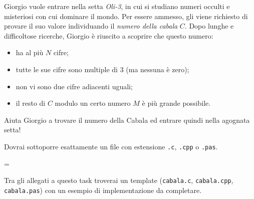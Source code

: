 \usepackage{xcolor}
\usepackage{afterpage}
\usepackage{pifont,mdframed}
\usepackage[bottom]{footmisc}

\makeatletter
\gdef\this@inputfilename{input.txt}
\gdef\this@outputfilename{output.txt}
\makeatother

\newcommand{\inputfile}{\texttt{input.txt}}
\newcommand{\outputfile}{\texttt{output.txt}}

\newenvironment{warning}
  {\par\begin{mdframed}[linewidth=2pt,linecolor=gray]%
    \begin{list}{}{\leftmargin=1cm
                   \labelwidth=\leftmargin}\item[\Large\ding{43}]}
  {\end{list}\end{mdframed}\par}

	Giorgio vuole entrare nella setta \emph{Oli-3}, in cui si studiano numeri occulti e misteriosi con cui dominare il mondo. Per essere ammesso, gli viene richiesto di provare il suo valore individuando il \emph{numero della cabala} $C$. Dopo lunghe e difficoltose ricerche, Giorgio \`e riuscito a scoprire che questo numero:
	\begin{itemize}
		\item ha al pi\`u $N$ cifre;
		\item tutte le sue cifre sono multiple di 3 (ma nessuna è zero);
		\item non vi sono due cifre adiacenti uguali;
		\item il resto di $C$ modulo un certo numero $M$ \`e pi\`u grande possibile.
	\end{itemize}
	Aiuta Giorgio a trovare il numero della Cabala ed entrare quindi nella agognata setta!

\Implementation
Dovrai sottoporre esattamente un file con estensione \texttt{.c}, \texttt{.cpp} o \texttt{.pas}.

\begin{warning}
Tra gli allegati a questo task troverai un template (\texttt{cabala.c}, \texttt{cabala.cpp}, \texttt{cabala.pas}) con un esempio di implementazione da completare.
\end{warning}

